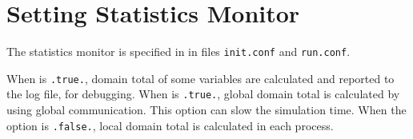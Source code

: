 \section{Setting Statistics Monitor} \label{subsec:statistics}

The statistics monitor is specified in  in files \verb|init.conf| and \verb|run.conf|.


\noindent
When  is \verb|.true.|, domain total of some variables are calculated and reported to the log file, for debugging.
%
When  is \verb|.true.|, global domain total is calculated by using global communication.
This option can slow the simulation time.
When the option is \verb|.false.|, local domain total is calculated in each process.



